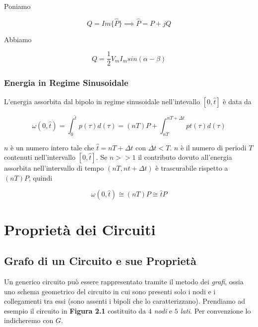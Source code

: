 \documentclass[a4paper]{report}
\begin{document}
Poniamo

\[
Q=Im \{\widehat P \} \implies \widehat P=P+jQ
\]

Abbiamo

\[
Q=\dfrac{1}{2}V_mI_m sin (\alpha-\beta)
\]

\subsection{Energia in Regime Sinusoidale}
L'energia assorbita dal bipolo in regime sinusoidale nell'intevallo $[0,
  \widehat {t}]$ \`e data da

\[
\omega (0, \widehat t)=\int_0^{\widehat t} p(\tau)d(\tau)=(nT)P+
\int_{nT}^{nT+\Delta t} pt(\tau)d(\tau)
\]


$n$ \`e un numero intero tale che $\widehat{t}=nT+\Delta t$ con $\Delta t<
T$. $n$ \`e il numero di periodi $T$ contenuti nell'intervallo $[0,
  \widehat t]$.
Se $n>>1$ il contributo dovuto all'energia assorbita nell'intervallo
di tempo $(nT, nt+\Delta t)$ \`e trascurabile rispetto a $(nT)P$,
quindi

\[
\omega(0,\widehat t) \cong (nT)P \cong {\widehat t} P
\]


\chapter{Propriet\`a dei Circuiti}

\section{Grafo di un Circuito e sue Propriet\`a}

Un generico circuito pu\`o essere rappresentato tramite il metodo dei
\emph{grafi}, ossia uno schema geometrico del circuito in cui sono
presenti solo i nodi e i collegamenti tra essi (sono assenti i bipoli
che lo caratterizzano). Prendiamo ad esempio il circuito in {\bf
  Figura 2.1} costituito da $4$ \emph{nodi} e $5$ \emph{lati}. Per
convenzione lo indicheremo con $G$.
\end{document}
